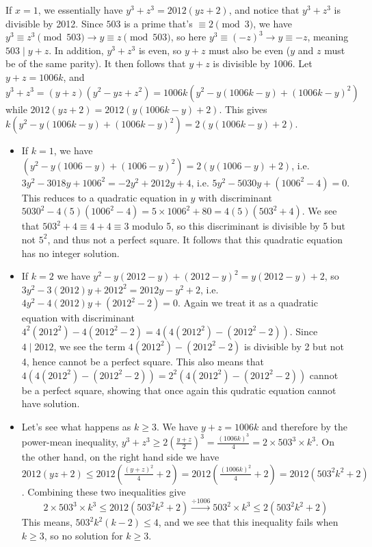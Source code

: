 \documentclass[11pt,a4paper]{article}
\begin{document}
\begin{enumerate}
	If $x=1$, we essentially have $y^3+z^3=2012(yz+2)$, and notice that $y^3+z^3$ is divisible by 2012. Since $503$ is a prime that's $\equiv 2\pmod{3}$, we have $y^3\equiv z^3\pmod{503}\to y\equiv z\pmod{503}$, so here $y^3\equiv(-z)^3\to y\equiv -z$, meaning $503\mid y+z$. 
	In addition, $y^3+z^3$ is even, so $y+z$ must also be even ($y$ and $z$ must be of the same parity). 
	It then follows that $y+z$ is divisible by 1006. 
	Let $y+z=1006k$, and $y^3+z^3=(y+z)(y^2-yz+z^2)=1006k(y^2-y(1006k-y)+(1006k-y)^2)$ while $2012(yz+2)=2012(y(1006k-y)+2)$. This gives $k(y^2-y(1006k-y)+(1006k-y)^2)=2(y(1006k-y)+2)$. 
	\begin{itemize}
		\item If $k=1$, we have 
		$(y^2-y(1006-y)+(1006-y)^2)=2(y(1006-y)+2)$, i.e. 
		$3y^2-3018y+1006^2=-2y^2+2012y+4$, i.e. 
		$5y^2-5030y+(1006^2-4)=0$. 
		This reduces to a quadratic equation in $y$ with discriminant 
		$5030^2-4(5)(1006^2-4)=5\times 1006^2+80=4(5)(503^2+4)$. 
		We see that $503^2+4\equiv 4+4\equiv 3$ modulo 5, so this discriminant is divisible by 5 but not $5^2$, and thus not a perfect square. It follows that this quadratic equation has no integer solution. 
		
		\item If $k=2$ we have 
		$y^2-y(2012-y)+(2012-y)^2 = y(2012-y)+2$, so 
		$3y^2-3(2012)y+2012^2=2012y-y^2+2$, i.e. 
		$4y^2-4(2012)y+(2012^2-2)=0$. 
		Again we treat it as a quadratic equation with discriminant 
		$4^2(2012^2)-4(2012^2-2)=4(4(2012^2)-(2012^2-2))$. Since $4\mid 2012$, we see the term $4(2012^2)-(2012^2-2)$ is divisible by 2 but not 4, hence cannot be a perfect square. This also means that $4(4(2012^2)-(2012^2-2))=2^2(4(2012^2)-(2012^2-2))$ cannot be a perfect square, showing that once again this qudratic equation cannot have solution. 
		
		\item Let's see what happens as $k\ge 3$. 
		We have $y+z=1006k$ and therefore by the power-mean inequality, 
		$y^3+z^3\ge 2(\frac{y+z}{2})^3=\frac{(1006k)^3}{4}=2\times 503^3\times k^3$. 
		On the other hand, on the right hand side we have 
		$2012(yz+2)\le 2012(\frac{(y+z)^2}{4}+2)=2012(\frac{(1006k)^2}{4}+2)=2012(503^2k^2+2)$. Combining these two inequalities give 
		\[2\times 503^3\times k^3\le 2012(503^2k^2+2)\stackrel{\div 1006}{\to}
		503^2\times k^3\le 2(503^2k^2+2)
		\]
		This means, $503^2k^2(k-2)\le 4$, and 
		we see that this inequality fails when $k\ge 3$, so no solution for $k\ge 3$. 
		

\end{itemize}
\end{enumerate}
\end{document}
